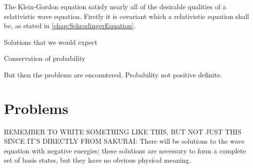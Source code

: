 The Klein-Gordon equation satisfy nearly all of the desirable qualities of a relativistic wave equation. Firstly it is covariant which a relativistic equation shall be, as stated in \cref{chap:SchrodingerEquation}.

Solutions that we would expect

Conservation of probability

But then the problems are encountered. Probability not positive definite.


\section{Problems}

REMEMBER TO WRITE SOMETHING LIKE THIS, BUT NOT JUST THIS SINCE IT'S DIRECTLY FROM SAKURAI: There will be solutions to the wave equation with negative energies; these solutions are necessary to form a complete set of basis states, but they have no obvious physical meaning.